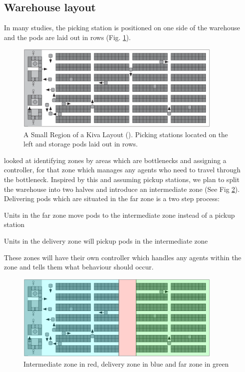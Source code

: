 \documentclass[a4paper,11pt]{article}
\begin{document}
\subsection{Warehouse layout}
In many studies, the picking station is positioned on one side of the warehouse and the pods are laid out in rows (Fig. \ref{kivalayout1}).

\begin{figure}[h]
	\centering
	\includegraphics[width=0.9\textwidth]{kivasystemlayout}
	\caption{A Small Region of a Kiva Layout (\cite{wurman2008coordinating}). Picking stations located on the left and storage pods laid out in rows.}
	\label{kivalayout1}
\end{figure}

\cite{wilt2014spatially} looked at identifying zones by areas which are bottlenecks and assigning a controller, for that zone which manages any agents who need to travel through the bottleneck. Inspired by this and assuming pickup stations, we plan to split the warehouse into two halves and introduce an intermediate zone (See Fig \ref{kivalayout2}). Delivering pods which are situated in the far zone is a two step process:
\begin{compactenum}
	\item Units in the far zone move pods to the intermediate zone instead of a pickup station
	\item Units in the delivery zone will pickup pods in the intermediate zone
\end{compactenum}
\noindent These zones will have their own controller which handles any agents within the zone and tells them what behaviour should occur.

\begin{figure}[h]
	\centering
	\includegraphics[width=0.9\textwidth]{kivasystemlayout_adjusted}
	\caption{Intermediate zone in red, delivery zone in blue and far zone in green}
	\label{kivalayout2}
\end{figure}
\end{document}
